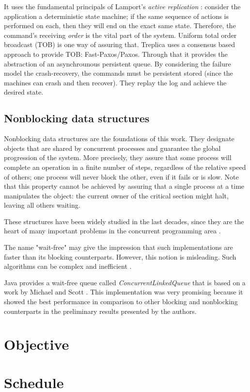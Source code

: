 \documentclass[12pt]{article}
\begin{document}
 It uses the fundamental principals of Lamport's \textit{active replication} \cite{Lamport1978}: consider the application a deterministic state machine; if the same sequence of actions is performed on each, then they will end on the exact same state. Therefore, the command's receiving \textit{order} is the vital part of the system. Uniform total order broadcast (TOB) is one way of assuring that. Treplica uses a consensus based approach to provide TOB: Fast-Paxos/Paxos. Through that it provides the abstraction of an asynchrounous persistent queue.
By considering the failure model the crash-recovery, the commands must be persistent stored (since the machines can crash and then recover). They replay the log and achieve the desired state.


\subsection{Nonblocking data structures}
Nonblocking data structures are the foundations of this work. They designate
objects that are shared by concurrent processes and guarantee the global
progression of the system. More precisely, they  assure that some process will
complete an operation in a finite number of steps, regardless of the relative
speed of others; one process will never block the other, even if it fails or is
slow. Note that this  property cannot be achieved by assuring that a single
process at a time manipulates the object: the current owner of the critical
section might halt, leaving all others waiting.

These structures have been widely studied in the last decades, since they are
the heart of many important problems in the concurrent programming area
\cite{herlihy2011art}.

The name "wait-free" may give the impression that such implementations are
faster than its blocking counterparts. However, this notion is misleading.  Such
algorithms can be complex and inefficient \cite{attiya1994wait}.

Java provides a wait-free queue called \textit{ConcurrentLinkedQueue} that is
based on a work by Michael and Scott \cite{michael1996simple}. This
implementation was very promising because it showed the best performance in
comparison to other blocking and nonblocking counterparts in the preliminary
results presented by the authors.


\section{Objective}
\label{sec:contrib}



\section{Schedule}
\label{sec:schedule}


\vskip 15mm

{}

\end{document}
